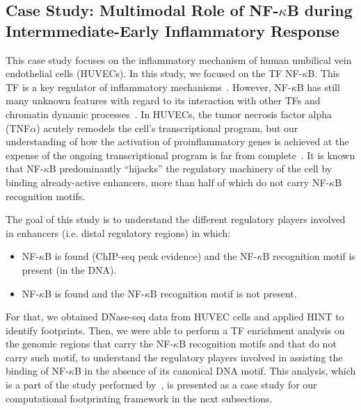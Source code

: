 \subsection{Case Study: Multimodal Role of NF-$\kappa$B during Intermmediate-Early Inflammatory Response}
\label{sec:case.study.nfkb}

This case study focuses on the inflammatory mechanism of human umbilical vein endothelial cells (HUVECs). In this study, we focused on the TF NF-$\kappa$B. This TF is a key regulator of inflammatory mechanisms~\citep{hayden2012}. However, NF-$\kappa$B has still many unknown features with regard to its interaction with other TFs and chromatin dynamic processes~\citep{hayden2012}. In HUVECs, the tumor necrosis factor alpha (TNF$\alpha$) acutely remodels the cell’s transcriptional program, but our understanding of how the activation of proinflammatory genes is achieved at the expense of the ongoing transcriptional program is far from complete~\citep{kempe2005}. It is known that NF-$\kappa$B predominantly ``hijacks'' the regulatory machinery of the cell by binding already-active enhancers, more than half of which do not carry NF-$\kappa$B recognition motifs.

The goal of this study is to understand the different regulatory players involved in enhancers (i.e. distal regulatory regions) in which:

\begin{itemize}
\item NF-$\kappa$B is found (ChIP-seq peak evidence) and the NF-$\kappa$B recognition motif is present (in the DNA).
\item NF-$\kappa$B is found and the NF-$\kappa$B recognition motif is not present.
\end{itemize}

For that, we obtained DNase-seq data from HUVEC cells and applied HINT to identify footprints. Then, we were able to perform a TF enrichment analysis on the genomic regions that carry the NF-$\kappa$B recognition motifs and that do not carry such motif, to understand the regulatory players involved in assisting the binding of NF-$\kappa$B in the absence of its canonical DNA motif. This analysis, which is a part of the study performed by~\cite{kolovos2016}, is presented as a case study for our computational footprinting framework in the next subsections.

